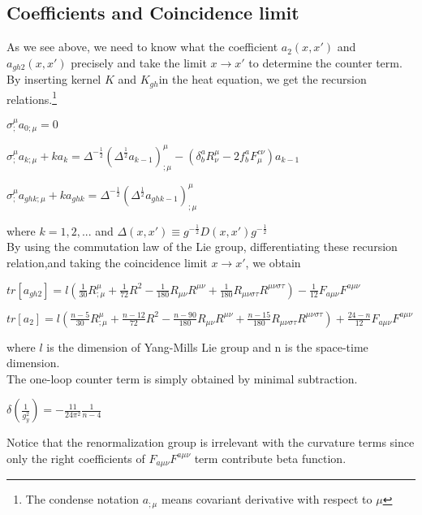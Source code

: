 \documentclass[a4paper,12 pt]{article}
\begin{document}
\subsection{Coefficients and Coincidence limit}
As we see above, we need to know what the coefficient
$a_{2}(x,x')$ and $a_{gh 2}(x,x')$ precisely and take the limit $
x \rightarrow x' $ to determine the counter term. By inserting
kernel $ K $ and $ K_{gh} $in the heat equation, we get the
recursion relations.\footnote{The condense notation $ a_{;\mu} $
means covariant derivative with respect to $\mu $}
\begin{center}
$ \sigma_{;}^{\mu}a_{0;\mu} = 0$
\end{center}
\begin{center}
$ \sigma_{;}^{\mu} a_{k ; \mu} + k a_{k} =
\Delta^{-\frac{1}{2}}(\Delta^{\frac{1}{2}}a_{k-1})_{ ; \mu}^{\mu}
- (\delta^{a}_{b}R_{\nu}^{\mu}-2f^{a}_{b}F^{c\nu}_{\mu}) a_{k-1} $
\end{center}
\begin{center}
$ \sigma_{;}^{\mu} a_{gh k ; \mu} + k a_{gh k} =
\Delta^{-\frac{1}{2}}(\Delta^{\frac{1}{2}}a_{gh k-1})_{ ;
\mu}^{\mu} $
\end{center}
where $k = 1,2,...$ and $ \Delta(x,x')\equiv
g^{-\frac{1}{2}}D(x,x')g^{-\frac{1}{2}}$ \\
By using the commutation law of the Lie group, differentiating
these recursion relation,and taking the coincidence limit
$x\rightarrow x'$, we obtain
\begin{center} $tr[a_{gh 2}] = l
(\frac{1}{30}R_{;\mu}^{\mu}+\frac{1}{72}R^{2}-\frac{1}{180}R_{\mu\nu}R^{\mu\nu}+
\frac{1}{180}R_{\mu\nu\sigma\tau}R^{\mu\nu\sigma\tau})-
\frac{1}{12}F_{a\mu\nu}F^{a\mu\nu}$
\end{center}
\begin{center}
$tr[a_{2}] = l
(\frac{n-5}{30}R_{;\mu}^{\mu}+\frac{n-12}{72}R^{2}-\frac{n-90}{180}R_{\mu\nu}R^{\mu\nu}+
\frac{n-15}{180}R_{\mu\nu\sigma\tau}R^{\mu\nu\sigma\tau})+
\frac{24-n}{12}F_{a\mu\nu}F^{a\mu\nu}$
\end{center}
where $l$ is the dimension of Yang-Mills Lie group and n is the
space-time dimension.\\
The one-loop counter term is simply obtained by minimal
subtraction.
\begin{center} $ \delta(\frac{1}{g_{y}^{2}}) = - \frac{11}{24
\pi^{2}}\frac{1}{n-4}$
\end{center}

Notice that the renormalization group is irrelevant with the
curvature terms since only the right coefficients of
$F_{a\mu\nu}F^{a\mu\nu} $ term contribute beta function.
\end{document}
